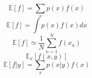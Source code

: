 $$\mathbb{E}[f]=\sum_{x}{p(x)f(x)}$$
$$\mathbb{E}[f]=\int{p(x)f(x)dx}$$
$$\mathbb{E}[f]\simeq \frac{1}{N}{\sum_{n=1}^{N}{f(x_n)}}$$
$$\mathbb{E}_{x}[f(x,y)]$$
$$\mathbb{E}[f|y]=\sum_{x}{p(x|y)f(x)}$$
